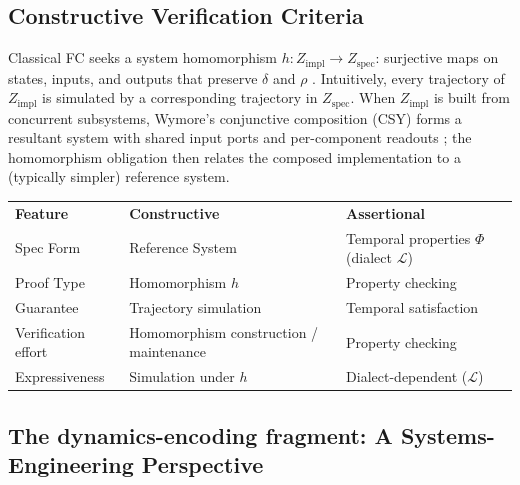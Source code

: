 \subsection{Constructive Verification Criteria}
\label{sec:constructive-criteria}
Classical FC seeks a system homomorphism $h : Z_{\text{impl}} \rightarrow Z_{\text{spec}}$: surjective maps on states, inputs, and outputs that preserve $\delta$ and $\rho$ \parencite{Wymore1993}. Intuitively, every trajectory of $Z_{\text{impl}}$ is simulated by a corresponding trajectory in $Z_{\text{spec}}$. When $Z_{\text{impl}}$ is built from concurrent subsystems, Wymore's conjunctive composition (CSY) forms a resultant system with shared input ports and per-component readouts \parencite{Wymore1993}; the homomorphism obligation then relates the composed implementation to a (typically simpler) reference system.

\begingroup
\renewcommand{\arraystretch}{1.5}
\begin{tabularx}{\textwidth}{@{}P{0.28\textwidth}YY@{}}
    \headingfont\bfseries Feature & \headingfont\bfseries Constructive & \headingfont\bfseries Assertional \\
    \addlinespace[4pt]
    Spec Form & Reference System & Temporal properties $\Phi$ (dialect $\mathcal{L}$) \\
    \addlinespace[4pt]
    Proof Type & Homomorphism $h$ & Property checking \\
    \addlinespace[4pt]
    Guarantee & Trajectory simulation & Temporal satisfaction \\
    \addlinespace[4pt]
    Verification effort & Homomorphism construction / maintenance & Property checking \\
    \addlinespace[4pt]
    Expressiveness & Simulation under $h$ & Dialect-dependent ($\mathcal{L}$) \\
\end{tabularx}
\label{tab:comparison}
\endgroup
\vspace{6pt}

\subsection{The dynamics-encoding fragment: A Systems-Engineering Perspective}
\label{sec:dynamics-encoding-fragment}

